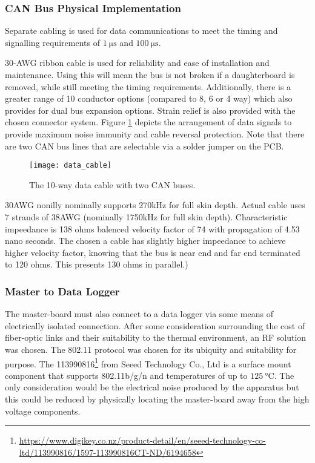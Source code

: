 \subsubsection{CAN Bus Physical Implementation}
Separate cabling is used for data communications to meet the timing and signalling requirements of $\SI{1}{\micro\second}$ and $\SI{100}{\micro\second}$.

30-AWG ribbon cable is used for reliability and ease of installation and maintenance.
Using this will mean the bus is not broken if a daughterboard is removed, while still meeting the timing requirements.
Additionally, there is a greater range of 10 conductor options (compared to 8, 6 or 4 way) which also provides for dual bus expansion options.
Strain relief is also provided with the chosen connector system.
Figure \ref{fig:data_cable} depicts the arrangement of data signals to provide maximum noise immunity and cable reversal protection.
Note that there are two CAN bus lines that are selectable via a solder jumper on the PCB.
\begin{figure}[H]
	\centering
	\texttt{[image: data\_cable]}
	\caption{The 10-way data cable with two CAN buses.}
	\label{fig:data_cable}
\end{figure}

30AWG nonilly nominally supports 270kHz for full skin depth.	Actual cable uses 7 strands of 38AWG (nominally 1750kHz for full skin depth).
	Characteristic impeedance is 138 ohms balenced velocity factor of 74 with propagation of 4.53 nano seconds.
	The chosen a cable has slightly higher impeedance to achieve higher velocity factor, knowing that the bus is near end and far end terminated to 120 ohms. This presents 130 ohms in parallel.)

\subsubsection{Master to Data Logger}

The master-board must also connect to a data logger via some means of electrically isolated connection.
After some consideration surrounding the cost of fiber-optic links and their suitability to the thermal environment, an RF solution was chosen.
The 802.11 protocol was chosen for its ubiquity and suitability for purpose.
The 113990816\footnote{\url{https://www.digikey.co.nz/product-detail/en/seeed-technology-co-ltd/113990816/1597-113990816CT-ND/6194658}} from Seeed Technology Co., Ltd is a surface mount component that supports 802.11b/g/n and temperatures of up to $\SI{125}{\degreeCelsius}$.
The only consideration would be the electrical noise produced by the apparatus but this could be reduced by physically locating the master-board away from the high voltage components.
